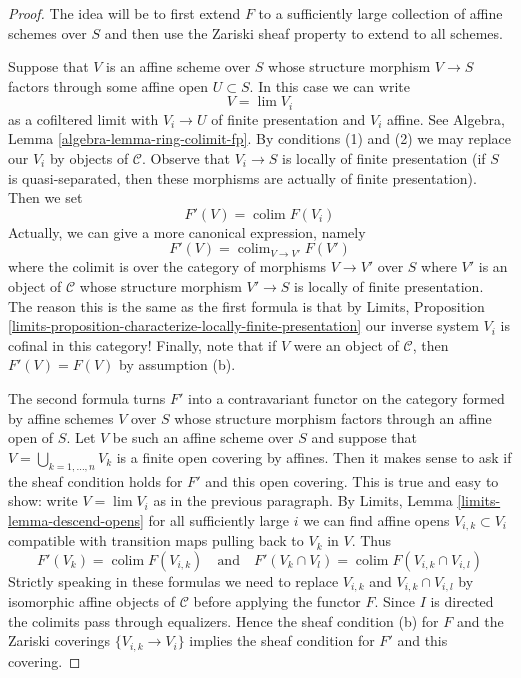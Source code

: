 \documentclass[10pt,a4paper]{amsart}
\theoremstyle{plain}
\theoremstyle{definition}
\theoremstyle{remark}
\numberwithin{equation}{subsection}
\def\lim{\mathop{\mathrm{lim}}\nolimits}
\def\colim{\mathop{\mathrm{colim}}\nolimits}
\begin{document}
\begin{proof}
The idea will be to first extend $F$ to a sufficiently large collection of
affine schemes over $S$ and then use the Zariski sheaf property to extend
to all schemes.

\medskip\noindent
Suppose that $V$ is an affine scheme over $S$ whose structure morphism
$V \to S$ factors through some affine open $U \subset S$. In this case
we can write
$$
V = \lim V_i
$$
as a cofiltered limit with $V_i \to U$ of finite presentation
and $V_i$ affine. See Algebra, Lemma \ref{algebra-lemma-ring-colimit-fp}.
By conditions (1) and (2)
we may replace our $V_i$ by objects of $\mathcal{C}$.
Observe that $V_i \to S$ is locally of finite presentation
(if $S$ is quasi-separated, then these morphisms are actually
of finite presentation). Then we set
$$
F'(V) = \colim F(V_i)
$$
Actually, we can give a more canonical expression, namely
$$
F'(V) = \colim_{V \to V'} F(V')
$$
where the colimit is over the category of morphisms $V \to V'$ over $S$
where $V'$ is an object of $\mathcal{C}$ whose structure
morphism $V' \to S$ is locally of finite presentation.
The reason this is the same as the first formula is that by
Limits, Proposition
\ref{limits-proposition-characterize-locally-finite-presentation}
our inverse system $V_i$ is cofinal in this category!
Finally, note that if $V$ were an object of $\mathcal{C}$,
then $F'(V) = F(V)$ by assumption (b).

\medskip\noindent
The second formula turns $F'$ into a contravariant functor
on the category formed by affine schemes $V$ over $S$ whose
structure morphism factors through an affine open of $S$.
Let $V$ be such an affine scheme over $S$ and
suppose that $V = \bigcup_{k = 1, \ldots, n} V_k$ is a finite open covering
by affines. Then it makes sense to ask if the sheaf condition
holds for $F'$ and this open covering.
This is true and easy to show: write $V = \lim V_i$ as in
the previous paragraph. By Limits, Lemma \ref{limits-lemma-descend-opens}
for all sufficiently large $i$ we can find affine opens
$V_{i, k} \subset V_i$ compatible with transition maps
pulling back to $V_k$ in $V$. Thus
$$
F'(V_k) = \colim F(V_{i, k})
\quad\text{and}\quad
F'(V_k \cap V_l) = \colim F(V_{i, k} \cap V_{i, l})
$$
Strictly speaking in these formulas we need to replace $V_{i, k}$ and
$V_{i, k} \cap V_{i, l}$ by isomorphic affine objects of $\mathcal{C}$
before applying the functor $F$.
Since $I$ is directed the colimits pass through equalizers.
Hence the sheaf condition (b) for $F$ and the Zariski coverings
$\{V_{i, k} \to V_i\}$ implies the sheaf
condition for $F'$ and this covering.


\end{proof}
\end{document}
